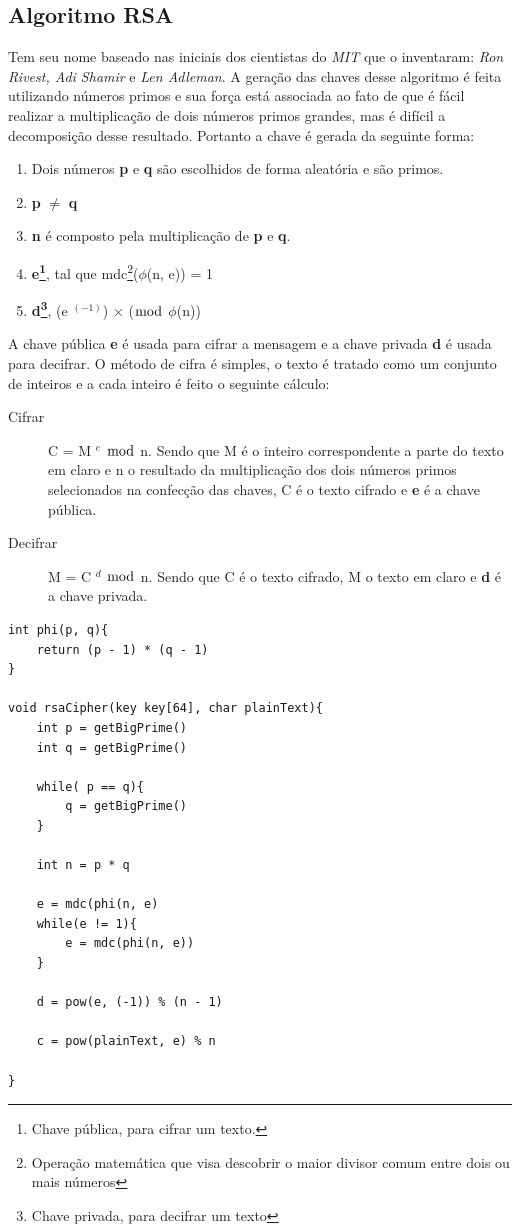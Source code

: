\subsection{Algoritmo RSA}
\label{algorithm-rsa}

Tem seu nome baseado nas iniciais dos cientistas do \textit{MIT} que o inventaram: \textit{Ron Rivest, Adi Shamir} e \textit{Len Adleman}. A geração das chaves desse algoritmo é feita utilizando números primos e sua força está associada ao fato de que é fácil realizar a multiplicação de dois números primos grandes, mas é difícil a decomposição desse resultado. Portanto a chave é gerada da seguinte forma:

\begin{enumerate}
\item Dois números \textbf{p} e \textbf{q} são escolhidos de forma aleatória e são primos.
\item \textbf{p} $\neq$ \textbf{q}
\item \textbf{n} é composto pela multiplicação de \textbf{p} e \textbf{q}.
\item \textbf{e\footnote{Chave pública, para cifrar um texto.}}, tal que mdc\footnote{Operação matemática que visa descobrir o maior divisor comum entre dois ou mais números}($\phi$(n, e)) = 1
\item \textbf{d\footnote{Chave privada, para decifrar um texto }}, (e $^ {(-1)}$) $\times$ ($\bmod$ $\phi$(n)) 
\end{enumerate}

%
A chave pública \textbf{e}  é usada para cifrar a mensagem e a chave privada \textbf{d} é usada para decifrar. O método de cifra é simples, o texto é tratado como um conjunto de inteiros e a cada inteiro é feito o seguinte cálculo:

\begin{description}
\item [Cifrar]
C = M $^ e$ $\bmod$ n. Sendo que M é o inteiro correspondente a parte do texto em claro e n o resultado da multiplicação dos dois números primos selecionados na confecção  das chaves, C é o texto cifrado e \textbf{e} é a chave pública. 
\item [Decifrar]
M = C $^ d$ $\bmod$ n. Sendo que C é o texto cifrado, M o texto em claro e \textbf{d} é a chave privada.
\end{description}

\begin{lstlisting}[caption={Pseudo-código RSA}, label=rsa-pseudo-code]
int phi(p, q){
	return (p - 1) * (q - 1)
}

void rsaCipher(key key[64], char plainText){
	int p = getBigPrime()
	int q = getBigPrime()
	
	while( p == q){
		q = getBigPrime()
	}
	
	int n = p * q
	
	e = mdc(phi(n, e)
	while(e != 1){
		e = mdc(phi(n, e))
	}
	
	d = pow(e, (-1)) % (n - 1)
	
	c = pow(plainText, e) % n
	
}
    \end{lstlisting}

